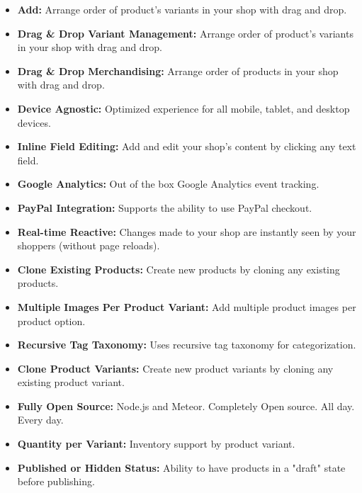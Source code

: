 \begin{itemize}
	\item \textbf{ Add:} Arrange order of product's variants in your shop with drag and drop.
	
	\item \textbf{ Drag \& Drop Variant Management:} Arrange order of product's variants in your shop with drag and drop.
	
	\item \textbf{ Drag \& Drop Merchandising:} Arrange order of products in your shop with drag and drop.
	
	\item \textbf{ Device Agnostic:} Optimized experience for all mobile, tablet, and desktop devices.
	
	\item \textbf{ Inline Field Editing:} Add and edit your shop's content by clicking any text field.
	
	\item \textbf{ Google Analytics:} Out of the box Google Analytics event tracking.
	
	\item \textbf{ PayPal Integration:} Supports the ability to use PayPal checkout.
	
	\item \textbf{ Real-time Reactive:} Changes made to your shop are instantly seen by your shoppers (without page reloads).
	
	\item \textbf{ Clone Existing Products:} Create new products by cloning any existing products.
	
	\item \textbf{ Multiple Images Per Product Variant:} Add multiple product images per product option.
	
	\item \textbf{ Recursive Tag Taxonomy:} Uses recursive tag taxonomy for categorization.
	
	\item \textbf{ Clone Product Variants:} Create new product variants by cloning any existing product variant.
	
	\item \textbf{ Fully Open Source:} Node.js and Meteor. Completely Open source. All day. Every day.
	
	\item \textbf{ Quantity per Variant:} Inventory support by product variant.
	
	\item \textbf{ Published or Hidden Status:} Ability to have products in a "draft" state before publishing.
	

\end{itemize}
